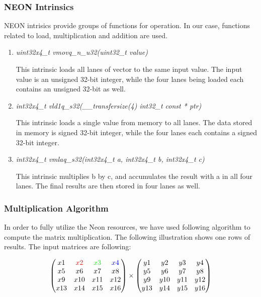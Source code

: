 \subsubsection{NEON Intrinsics}
NEON intrisics provide groups of functions for operation. 
In our case, functions related to load, multiplication and addition are used. 
\begin{enumerate}
\item \emph{uint32x4\_t  vmovq\_n\_u32(uint32\_t value)}

This intrinsic loads all lanes of vector to the same input value. 
The input value is an unsigned 32-bit integer, 
while the four lanes being loaded each contains an unsigned 32-bit as well.


\item \emph{int32x4\_t   vld1q\_s32(\_\_transfersize(4) int32\_t const * ptr)}

This intrinsic loads a single value from memory to all lanes.
The data stored in memory is signed 32-bit integer, 
while the four lanes each contains a signed 32-bit integer.

\item \emph{int32x4\_t   vmlaq\_s32(int32x4\_t a, int32x4\_t b, int32x4\_t c)}

This intrinsic multiplies b by c, and accumulates the result with a in all four lanes.
The final results are then stored in four lanes as well.
\end{enumerate}

\subsubsection{Multiplication Algorithm}

In order to fully utilize the Neon resources, we have used following algorithm to compute the matrix multiplication. The following illustration shows one rows of results.
The input matrices are following:

$$
\begin{pmatrix}
 x1 	& \color{red}{x2} 	& \color{green}{x3} & \color{blue}{x4}\\
 x5 	& x6 				& x7&x8\\
 x9 	& x10 				& x11&x12\\
 x13 	& x14 				& x15&x16\\
\end{pmatrix}
\times
\begin{pmatrix}
y1&y2&y3&y4\\
y5&y6&y7&y8\\
y9&y10&y11&y12\\
y13&y14&y15&y16\\
\end{pmatrix}
$$


